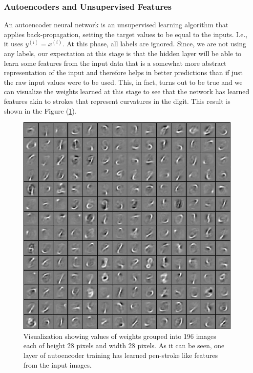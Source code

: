\documentclass[10pt,twocolumn,letterpaper]{article}
\begin{document}
\subsubsection{Autoencoders and Unsupervised Features}
An autoencoder neural network is an unsupervised learning algorithm that applies back-propagation, setting the target values to be equal to the inputs. I.e., it uses $y^{(i)} = x^{(i)}$. At this phase, all labels are ignored. Since, we are not using any labels, our expectation at this stage is that the hidden layer will be able to learn some features from the input data that is a somewhat more abstract representation of the input and therefore helps in better predictions than if just the raw input values were to be used. This, in fact, turns out to be true and we can visualize the weights learned at this stage to see that the network has learned features akin to strokes that represent curvatures in the digit. This result is shown in the Figure (\ref{fig:weights}).
\begin{figure}[t]
\begin{center}
   \includegraphics[width=1\linewidth]{../images/weights.jpg}
\end{center}
   \caption{Visualization showing values of weights grouped into 196 images each of height 28 pixels and width 28 pixels. As it can be seen, one layer of autoencoder training has learned pen-stroke like features from the input images.}
   \label{fig:weights}
\end{figure}
\end{document}
